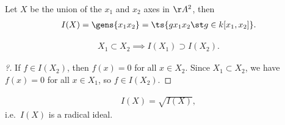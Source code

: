 \begin{example}

Let \(X\) be the union of the \(x_1\) and \(x_2\) axes in \(\AA^2\),
then
\begin{align*}
I(X) = \gens{x_1 x_2} = \ts {g x_1 x_2 \st g\in k[x_1, x_2]}
.\end{align*}

\end{example}

\begin{proposition}

\begin{align*}  
X_1 \subset X_2 \implies I(X_1) \supset I(X_2)
.\end{align*}

\end{proposition}

\begin{proof}[?]

If \(f\in I(X_2)\), then \(f(x) = 0\) for all \(x\in X_2\). Since
\(X_1 \subset X_2\), we have \(f(x) = 0\) for all \(x\in X_1\), so
\(f\in I(X_2)\).

\end{proof}

\begin{proposition}

\begin{align*}  
I(X) = \sqrt{I(X)}
,\end{align*} i.e.~\(I(X)\) is a radical ideal.

\end{proposition}

